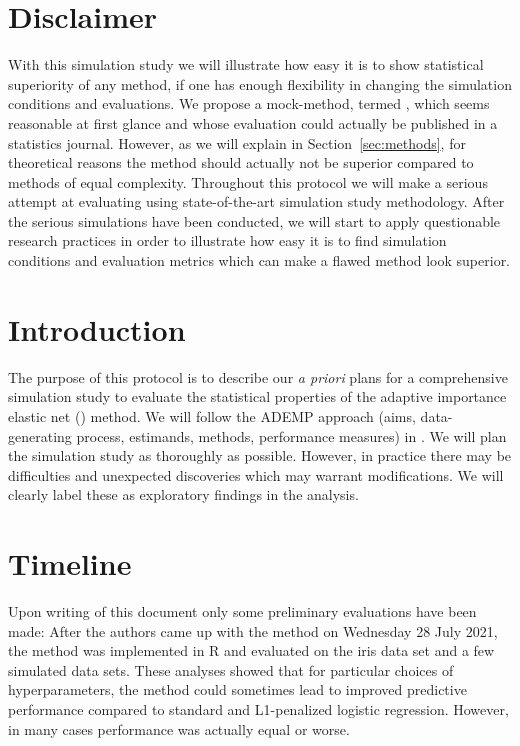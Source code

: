 \documentclass[a4paper, 11pt]{article}\usepackage[]{graphicx}\usepackage[]{color}
\title{
  \vspace{-2em}
  \textbf{\longtitle} \\
  \subtitle
}
\author{
  \textbf{\longauthors}
}
\date{\today} %
\begin{document}
\maketitle



\section{Disclaimer}
\label{sec:disclaimer}
With this simulation study we will illustrate how easy it is to show
statistical superiority of any method, if one has enough flexibility in
changing the simulation conditions and evaluations. We propose a mock-method,
termed \ainet{}, which seems reasonable at first glance and whose evaluation could actually be
published in a statistics journal. However, as we will explain in Section~\ref{sec:methods},
for theoretical reasons the method should actually not be
superior compared to methods of equal complexity. Throughout this protocol
we will make a serious attempt at evaluating \ainet{} using state-of-the-art
simulation study methodology. After the serious simulations
have been conducted, we will start to apply questionable research practices
in order to illustrate how easy it is to find simulation conditions and evaluation
metrics which can make a flawed method look superior.

\section{Introduction}
\label{sec:introduction}
The purpose of this protocol is to describe our \emph{a priori} plans for a
comprehensive simulation study to evaluate the statistical properties of the
adaptive importance elastic net (\ainet) method. We will follow the ADEMP
approach (aims, data-generating process, estimands, methods, performance
measures) in \citet{Morris2019}. We will plan the simulation study as
thoroughly as possible. However, in practice there may be difficulties
and unexpected discoveries which may warrant modifications. 
We will clearly label these as exploratory findings in the analysis.

\section{Timeline}
\label{sec:timeline}
Upon writing of this document only some preliminary evaluations have been made:
After the authors came up with the method on Wednesday 28 July 2021, the method
was implemented in \textsf{R} and evaluated on the iris data set and a few 
simulated data sets.
These analyses showed that for particular choices of hyperparameters, the
method could sometimes lead to improved predictive performance compared to
standard and L1-penalized logistic regression. However, in many cases
performance was actually equal or worse.
\end{document}
